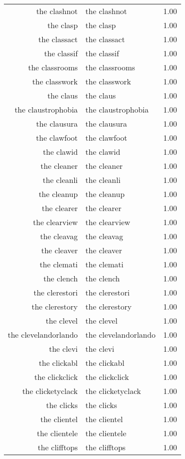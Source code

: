 \begin{table}[ht]
\begin{tabular}{rlr}
  the clashnot & the clashnot & 1.00 \\ 
  the clasp & the clasp & 1.00 \\ 
  the classact & the classact & 1.00 \\ 
  the classif & the classif & 1.00 \\ 
  the classrooms & the classrooms & 1.00 \\ 
  the classwork & the classwork & 1.00 \\ 
  the claus & the claus & 1.00 \\ 
  the claustrophobia & the claustrophobia & 1.00 \\ 
  the clausura & the clausura & 1.00 \\ 
  the clawfoot & the clawfoot & 1.00 \\ 
  the clawid & the clawid & 1.00 \\ 
  the cleaner & the cleaner & 1.00 \\ 
  the cleanli & the cleanli & 1.00 \\ 
  the cleanup & the cleanup & 1.00 \\ 
  the clearer & the clearer & 1.00 \\ 
  the clearview & the clearview & 1.00 \\ 
  the cleavag & the cleavag & 1.00 \\ 
  the cleaver & the cleaver & 1.00 \\ 
  the clemati & the clemati & 1.00 \\ 
  the clench & the clench & 1.00 \\ 
  the clerestori & the clerestori & 1.00 \\ 
  the clerestory & the clerestory & 1.00 \\ 
  the clevel & the clevel & 1.00 \\ 
  the clevelandorlando & the clevelandorlando & 1.00 \\ 
  the clevi & the clevi & 1.00 \\ 
  the clickabl & the clickabl & 1.00 \\ 
  the clickclick & the clickclick & 1.00 \\ 
  the clicketyclack & the clicketyclack & 1.00 \\ 
  the clicks & the clicks & 1.00 \\ 
  the clientel & the clientel & 1.00 \\ 
  the clientele & the clientele & 1.00 \\ 
  the clifftops & the clifftops & 1.00 \\ 

\end{tabular}
\end{table}
